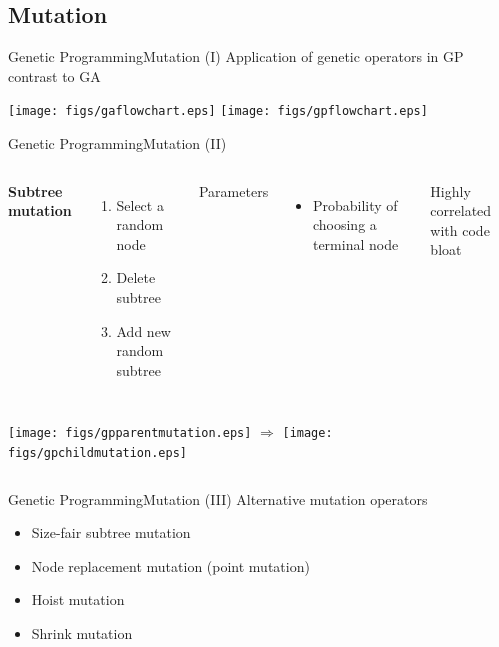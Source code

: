 \documentclass[10pt,compress]{beamer} %
\begin{document}
\subsection{Mutation}
\begin{frame}{Genetic Programming}{Mutation (I)} 
	Application of genetic operators in GP contrast to GA
	\begin{center}
		\texttt{[image: figs/gaflowchart.eps]} \quad\quad
		\texttt{[image: figs/gpflowchart.eps]}
	\end{center}
\end{frame}

\begin{frame}{Genetic Programming}{Mutation (II)} 
    \begin{columns}
	\textbf{Subtree mutation}
	\begin{enumerate}
		\item Select a random node
		\item Delete subtree
		\item Add new random subtree
	\end{enumerate}

	Parameters
	\begin{itemize}
		\item Probability of choosing a terminal node
	\end{itemize}

	Highly correlated with \alert{code bloat}
	\end{columns}

	\bigskip

    \begin{columns}
		\texttt{[image: figs/gpparentmutation.eps]} 
		$\Rightarrow$ 
		\texttt{[image: figs/gpchildmutation.eps]}
	\end{columns}
\end{frame}

\begin{frame}{Genetic Programming}{Mutation (III)} 
	Alternative mutation operators
	\begin{itemize}
		\item Size-fair subtree mutation
		\item Node replacement mutation (point mutation)
		\item Hoist mutation
		\item Shrink mutation
	\end{itemize}
\end{frame}
\end{document}
